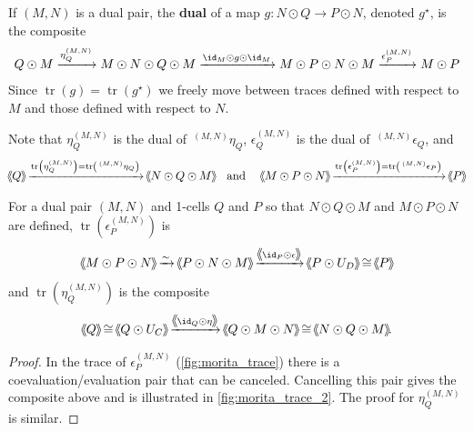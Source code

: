 \documentclass[11pt]{amsart}
\newcommand{\xto}{\xrightarrow}
\DeclareMathOperator{\tr}{tr}
\newcommand{\rsm}[4]{{#1}^{({#2},{#3})}_{#4}} %
\newcommand{\lsm}[4]{\,^{({#2},{#3})}{#1}_{#4}} %
\def\shvar#1#2{{\ensuremath{%
  \hspace{1mm}\makebox[-1mm]{$#1\langle$}\makebox[0mm]{$#1\langle$}\hspace{1mm}%
  {#2}%
  \makebox[1mm]{$#1\rangle$}\makebox[0mm]{$#1\rangle$}%
}}}
\def\sh{\shvar{}}
\begin{document}
 \begin{rmk}\label{left_or_right_for_trace} 
If $(M,N)$ is a dual pair, the {\bf dual} of a map 
$g\colon N\odot Q\to P\odot N$, denoted $g^\star$, is the composite 
\begin{align*}
	Q\odot M\xto{\rsm{\eta}{M}{N}{Q}}
 	M\odot N\odot Q\odot M\xto{\id_M \odot g\odot \id_M}M\odot P\odot N\odot M
	\xto{\rsm{\epsilon}{M}{N}{P} }
	M\odot P
\end{align*}
Since $\tr(g)=\tr(g^\star)$ \cite[Prop.~7.6]{ps:bicat} we freely move between traces defined with respect to $M$ and those defined with respect to $N$.

Note that  $\rsm{\eta}{M}{N}{Q}$ is the dual of $\lsm{\eta}{M}{N}{Q}$,
$\rsm{\epsilon}{M}{N}{Q}$ is the dual of $\lsm{\epsilon}{M}{N}{Q}$,
and 
\begin{gather*}
	\sh{Q}\xto{\tr\left(\rsm{\eta}{M}{N}{Q}\right)=\tr\left(\lsm{\eta}{M}{N}{Q}\right)} \sh{N\odot Q\odot M}
	\quad \text{and } \quad 
	\sh{M\odot P\odot N}\xto{\tr\left(\rsm{\epsilon}{M}{N}{P}\right)=\tr\left(\lsm{\epsilon}{M}{N}{P}\right)} \sh{P}
\end{gather*}
\end{rmk} 


\begin{lem}\label{rsm_simplified}
For a dual pair $(M,N)$ and 1-cells $Q$ and $P$ so that $N\odot Q\odot M$ and $M\odot P\odot N$ are defined, $\tr\left(\rsm{\epsilon}MNP\right)$  is 
\[
	\sh{M\odot P\odot N}\xto{\sim}\sh{P\odot N\odot M}\xto{\sh{\id_P\odot \epsilon}} \sh{P\odot U_D}\cong\sh{P}
\]
and 
$\tr\left(\rsm{\eta}MNQ\right)$ is the composite 
\[
\sh{Q}\cong \sh{Q\odot U_C}\xto{\sh{\id_Q\odot \eta}}\sh{Q\odot M\odot N}\cong \sh{N\odot Q\odot M}.
\]
\end{lem}

\begin{proof}
In the trace of $\rsm{\epsilon}{M}{N}{P}$  (\cref{fig:morita_trace}) there is a coevaluation/evaluation pair that can be canceled.  
Cancelling this pair gives the composite above and is illustrated in \cref{fig:morita_trace_2}.  
The proof for $\rsm{\eta}MNQ$ is similar.   
\end{proof}
\end{document}
